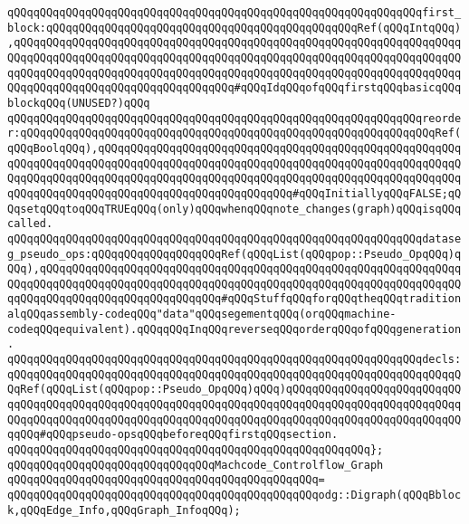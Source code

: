 \verb|qQQqqQQqqQQqqQQqqQQqqQQqqQQqqQQqqQQqqQQqqQQqqQQqqQQqqQQqqQQqqQQqfirst_block:qQQqqQQqqQQqqQQqqQQqqQQqqQQqqQQqqQQqqQQqqQQqqQQqRef(qQQqIntqQQq),qQQqqQQqqQQqqQQqqQQqqQQqqQQqqQQqqQQqqQQqqQQqqQQqqQQqqQQqqQQqqQQqqQQqqQQqqQQqqQQqqQQqqQQqqQQqqQQqqQQqqQQqqQQqqQQqqQQqqQQqqQQqqQQqqQQqqQQqqQQqqQQqqQQqqQQqqQQqqQQqqQQqqQQqqQQqqQQqqQQqqQQqqQQqqQQqqQQqqQQqqQQqqQQqqQQqqQQqqQQqqQQqqQQqqQQqqQQqqQQqqQQq#qQQqIdqQQqofqQQqfirstqQQqbasicqQQqblockqQQq(UNUSED?)qQQq|\newline
\verb|qQQqqQQqqQQqqQQqqQQqqQQqqQQqqQQqqQQqqQQqqQQqqQQqqQQqqQQqqQQqqQQqreorder:qQQqqQQqqQQqqQQqqQQqqQQqqQQqqQQqqQQqqQQqqQQqqQQqqQQqqQQqqQQqqQQqRef(qQQqBoolqQQq),qQQqqQQqqQQqqQQqqQQqqQQqqQQqqQQqqQQqqQQqqQQqqQQqqQQqqQQqqQQqqQQqqQQqqQQqqQQqqQQqqQQqqQQqqQQqqQQqqQQqqQQqqQQqqQQqqQQqqQQqqQQqqQQqqQQqqQQqqQQqqQQqqQQqqQQqqQQqqQQqqQQqqQQqqQQqqQQqqQQqqQQqqQQqqQQqqQQqqQQqqQQqqQQqqQQqqQQqqQQqqQQqqQQqqQQqqQQqqQQq#qQQqInitiallyqQQqFALSE;qQQqsetqQQqtoqQQqTRUEqQQq(only)qQQqwhenqQQqnote_changes(graph)qQQqisqQQqcalled.|\newline
\verb|qQQqqQQqqQQqqQQqqQQqqQQqqQQqqQQqqQQqqQQqqQQqqQQqqQQqqQQqqQQqqQQqdataseg_pseudo_ops:qQQqqQQqqQQqqQQqqQQqRef(qQQqList(qQQqpop::Pseudo_OpqQQq)qQQq),qQQqqQQqqQQqqQQqqQQqqQQqqQQqqQQqqQQqqQQqqQQqqQQqqQQqqQQqqQQqqQQqqQQqqQQqqQQqqQQqqQQqqQQqqQQqqQQqqQQqqQQqqQQqqQQqqQQqqQQqqQQqqQQqqQQqqQQqqQQqqQQqqQQqqQQqqQQqqQQqqQQqqQQq#qQQqStuffqQQqforqQQqtheqQQqtraditionalqQQqassembly-codeqQQq"data"qQQqsegementqQQq(orqQQqmachine-codeqQQqequivalent).qQQqqQQqInqQQqreverseqQQqorderqQQqofqQQqgeneration.|\newline
\verb|qQQqqQQqqQQqqQQqqQQqqQQqqQQqqQQqqQQqqQQqqQQqqQQqqQQqqQQqqQQqqQQqdecls:qQQqqQQqqQQqqQQqqQQqqQQqqQQqqQQqqQQqqQQqqQQqqQQqqQQqqQQqqQQqqQQqqQQqqQQqRef(qQQqList(qQQqpop::Pseudo_OpqQQq)qQQq)qQQqqQQqqQQqqQQqqQQqqQQqqQQqqQQqqQQqqQQqqQQqqQQqqQQqqQQqqQQqqQQqqQQqqQQqqQQqqQQqqQQqqQQqqQQqqQQqqQQqqQQqqQQqqQQqqQQqqQQqqQQqqQQqqQQqqQQqqQQqqQQqqQQqqQQqqQQqqQQqqQQqqQQqqQQq#qQQqpseudo-opsqQQqbeforeqQQqfirstqQQqsection.|\newline
\verb|qQQqqQQqqQQqqQQqqQQqqQQqqQQqqQQqqQQqqQQqqQQqqQQqqQQqqQQq};|\newline
\newline
\verb|qQQqqQQqqQQqqQQqqQQqqQQqqQQqqQQqMachcode_Controlflow_Graph|\newline
\verb|qQQqqQQqqQQqqQQqqQQqqQQqqQQqqQQqqQQqqQQqqQQqqQQq=|\newline
\verb|qQQqqQQqqQQqqQQqqQQqqQQqqQQqqQQqqQQqqQQqqQQqqQQqodg::Digraph(qQQqBblock,qQQqEdge_Info,qQQqGraph_InfoqQQq);|\newline
\newline
